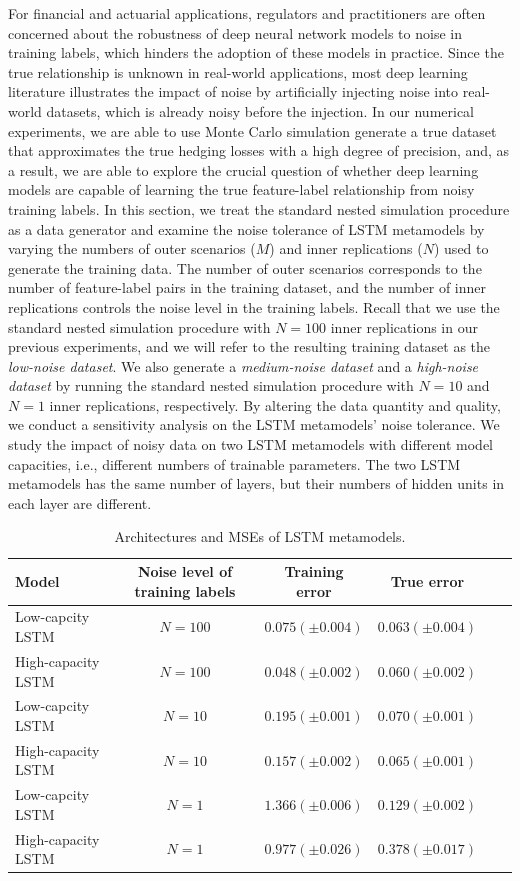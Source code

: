 \documentclass{article}
\begin{document}
For financial and actuarial applications, regulators and practitioners are often concerned about the robustness of deep neural network models to noise in training labels, which hinders the adoption of these models in practice.
Since the true relationship is unknown in real-world applications, most deep learning literature illustrates the impact of noise by artificially injecting noise into real-world datasets, which is already noisy before the injection.
In our numerical experiments, we are able to use Monte Carlo simulation generate a true dataset that approximates the true hedging losses with a high degree of precision, and, as a result, we are able to explore the crucial question of whether deep learning models are capable of learning the true feature-label relationship from noisy training labels.
In this section, we treat the standard nested simulation procedure as a data generator and examine the noise tolerance of LSTM metamodels by varying the numbers of outer scenarios ($M$) and inner replications ($N$) used to generate the training data.
The number of outer scenarios corresponds to the number of feature-label pairs in the training dataset, and the number of inner replications controls the noise level in the training labels.
Recall that we use the standard nested simulation procedure with $N=100$ inner replications in our previous experiments, and we will refer to the resulting training dataset as the \textit{low-noise dataset}.
We also generate a \textit{medium-noise dataset} and a \textit{high-noise dataset} by running the standard nested simulation procedure with $N=10$ and $N=1$ inner replications, respectively.
By altering the data quantity and quality, we conduct a sensitivity analysis on the LSTM metamodels' noise tolerance.
We study the impact of noisy data on two LSTM metamodels with different model capacities, i.e., different numbers of trainable parameters.
The two LSTM metamodels has the same number of layers, but their numbers of hidden units in each layer are different.

\begin{table}[ht!]
    \small
    \centering
    \begin{tabular}{lccccc}
        \toprule
        \textbf{Model} & \textbf{Noise level of training labels} & \textbf{Training error} & \textbf{True error}\\
        \midrule
        Low-capcity   LSTM & $N=100$ & $0.075 (\pm0.004)$ & $0.063 (\pm0.004)$ \\ 
        High-capacity LSTM & $N=100$ & $0.048 (\pm0.002)$ & $0.060 (\pm0.002)$ \\
        Low-capcity   LSTM & $N=10$  & $0.195 (\pm0.001)$ & $0.070 (\pm0.001)$ \\
        High-capacity LSTM & $N=10$  & $0.157 (\pm0.002)$ & $0.065 (\pm0.001)$ \\
        Low-capcity   LSTM & $N=1$   & $1.366 (\pm0.006)$ & $0.129 (\pm0.002)$ \\
        High-capacity LSTM & $N=1$   & $0.977 (\pm0.026)$ & $0.378 (\pm0.017)$ \\
        \bottomrule
    \end{tabular}
    \caption{Architectures and MSEs of LSTM metamodels.}
    \label{tab:lstm_arch}
\end{table}
\end{document}
